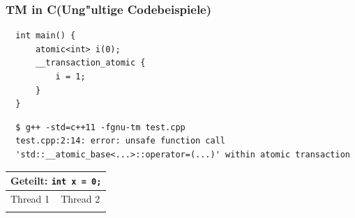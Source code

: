 \documentclass[t]{beamer}
\newcommand{\Rplus}{\protect\raisebox{.1ex}{+}}
\newcommand{\Cpp}{\mbox{C\Rplus\Rplus}\xspace}
\begin{document}
\begin{frame}[fragile]
  \frametitle{TM in \Cpp (Ung"ultige Codebeispiele)}

  \begin{lstlisting}
  int main() {
      atomic<int> i(0);
      __transaction_atomic {
          i = 1;
      }
  }
  \end{lstlisting}

  \begin{lstlisting}
  $ g++ -std=c++11 -fgnu-tm test.cpp
  test.cpp:2:14: error: unsafe function call
  'std::__atomic_base<...>::operator=(...)' within atomic transaction
  \end{lstlisting}

  \begin{center}
  \begin{tabular}{| l || l |} \hline
  \multicolumn{2}{|c|}{Geteilt: \lstinline|int x = 0;|} \\ \hline
  Thread 1 & Thread 2 \\ \hline

  \vtop{\null\hbox{\begin{lstlisting}
__transaction_atomic {
    x = 1;
}
  \end{lstlisting}}}

  &

  \vtop{\null\hbox{\begin{lstlisting}

x = 2;

  \end{lstlisting}}}

  \\
  \hline
  \end{tabular}
  \end{center}
\end{frame}
\end{document}
